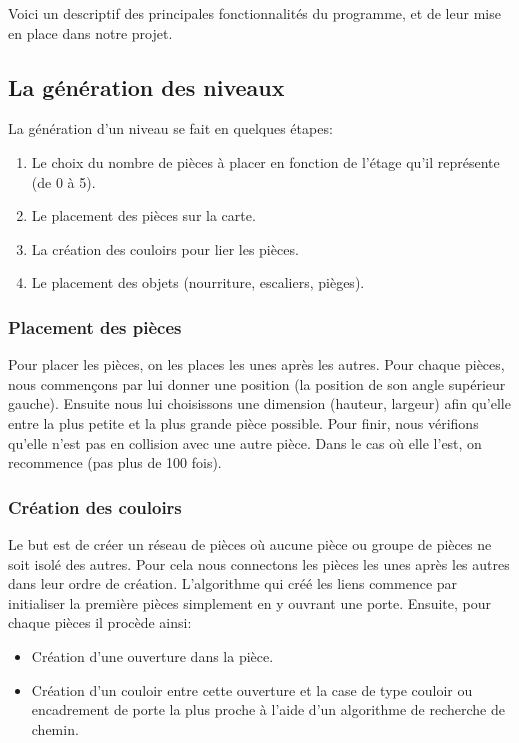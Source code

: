 \documentclass[11pt]{report}
\begin{document}
	Voici un descriptif des principales fonctionnalités du programme, et de leur mise en place dans notre projet.
	
		\subsection{La génération des niveaux}
		
		La génération d'un niveau se fait en quelques étapes:
		\begin{enumerate}
			\item Le choix du nombre de pièces à placer en fonction de l'étage qu'il représente (de 0 à 5).
			\item Le placement des pièces sur la carte.
			\item La création des couloirs pour lier les pièces.
			\item Le placement des objets (nourriture, escaliers, pièges).
		\end{enumerate}
		
			\subsubsection{Placement des pièces}
			
			Pour placer les pièces, on les places les unes après les autres. Pour chaque pièces, nous commençons par lui donner une position (la position de son angle supérieur gauche). Ensuite nous lui choisissons une dimension (hauteur, largeur) afin qu'elle entre la plus petite et la plus grande pièce possible.
			Pour finir, nous vérifions qu'elle n'est pas en collision avec une autre pièce.
			Dans le cas où elle l'est, on recommence (pas plus de 100 fois).
			
			\subsubsection{Création des couloirs}
			
			Le but est de créer un réseau de pièces où aucune pièce ou groupe de pièces ne soit isolé des autres.
			Pour cela nous connectons les pièces les unes après les autres dans leur ordre de création.
			L'algorithme qui créé les liens commence par initialiser la première pièces simplement en y ouvrant une porte.
			Ensuite, pour chaque pièces il procède ainsi:
			\begin{itemize}
				\item Création d'une ouverture dans la pièce.
				\item Création d'un couloir entre cette ouverture et la case de type couloir ou encadrement de porte la plus proche à l'aide d'un algorithme de recherche de chemin.
			\end{itemize}
		
\end{document}

